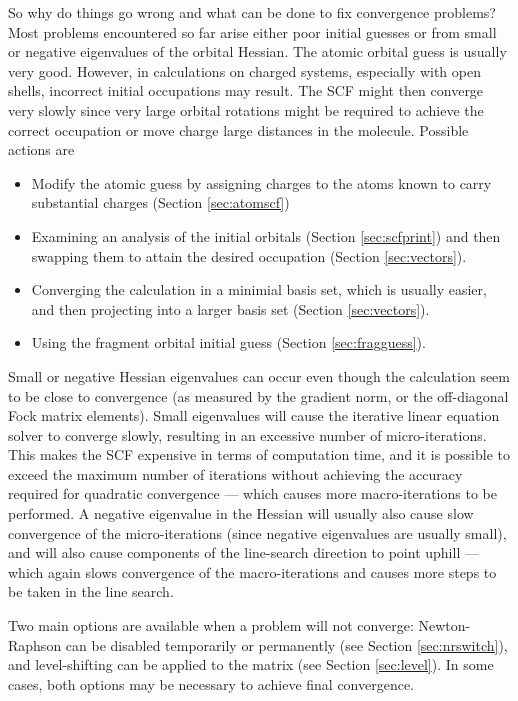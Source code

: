 So why do things go wrong and what can be done to fix convergence
problems?  Most problems encountered so far arise either poor initial
guesses or from small or negative eigenvalues of the orbital Hessian.
The atomic orbital guess is usually very good.  However, in
calculations on charged systems, especially with open shells,
incorrect initial occupations may result.  The SCF might then converge
very slowly since very large orbital rotations might be required to
achieve the correct occupation or move charge large distances in the
molecule.  Possible actions are
\begin{itemize}
\item Modify the atomic guess by assigning charges to the atoms
  known to carry substantial charges (Section \ref{sec:atomscf})
\item Examining an analysis of the initial orbitals (Section
  \ref{sec:scfprint}) and then swapping them to attain the desired
  occupation (Section \ref{sec:vectors}).
\item Converging the calculation in a minimial basis set, which is
  usually easier, and then projecting into a larger basis set (Section
  \ref{sec:vectors}).
\item Using the fragment orbital initial guess (Section
  \ref{sec:fragguess}).
\end{itemize}

Small or negative Hessian eigenvalues can occur even though the
calculation seem to be close to convergence (as measured by the
gradient norm, or the off-diagonal Fock matrix elements).  Small
eigenvalues will cause the iterative linear equation solver to
converge slowly, resulting in an excessive number of micro-iterations.
This makes the SCF expensive in terms of computation time, and it is
possible to exceed the maximum number of iterations without achieving
the accuracy required for quadratic convergence --- which causes more
macro-iterations to be performed.  A negative eigenvalue in the
Hessian will usually also cause slow convergence of the
micro-iterations (since negative eigenvalues are usually small), and
will also cause components of the line-search direction to point
uphill --- which again slows convergence of the macro-iterations and
causes more steps to be taken in the line search.

Two main options are available when a problem will not converge:
Newton-Raphson can be disabled temporarily or permanently (see Section
\ref{sec:nrswitch}), and level-shifting can be applied to the matrix
(see Section \ref{sec:level}).  In some cases, both options may be
necessary to achieve final convergence.

